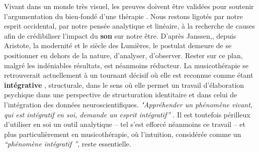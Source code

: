 Vivant dans un monde très visuel, les preuves doivent être
validées pour soutenir l'argumentation du bien-fondé d'une thérapie
\autocite{vrait_musicotherapie_2018}.
Nous restons
  ligotés par notre esprit occidental, par
  notre pensée analytique et linéaire, à la recherche de
  causes afin de crédibiliser l'impact
  du \textbf{son} sur notre être.
  D'après Janssen,\autocite{van_eersel_cerveau}, depuis Aristote, la modernité et le
siècle des Lumières, le postulat demeure de se positionner en dehors
de la nature, d'analyser, d'observer.
Rester sur ce plan, malgré les
indéniables résultats, est néanmoins
réducteur.
La musicothérapie  se retrouverait actuellement
 à un tournant décisif où elle est reconnue comme étant \textbf{intégrative} 
 \autocite{vrait_musicotherapie_2018},
struc\-tu\-rale, dans le sens où elle permet un travail d'élaboration psychique dans une perspective de structuration identitaire  et dans celui de l'intégration des données neuroscientifiques.
\textit{"Appréhender un phénomène vivant, qui est intégratif en soi, demande un esprit
  intégratif''} \autocite[201]{van_eersel_cerveau}.
Il est toutefois périlleux d'utiliser en soi un outil analytique -- tel s'est efforcé néanmoins ce travail -- et
plus
particulièrement en musicothérapie, où l'intuition, 
considérée comme un \textit{``phénomène intégratif ''}, reste essentielle.



